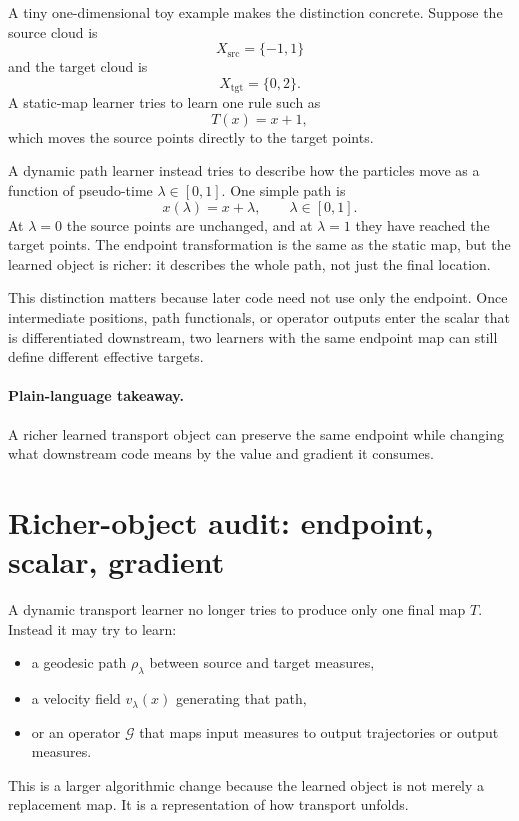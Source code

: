 A tiny one-dimensional toy example makes the distinction concrete.  Suppose the
source cloud is
\[
  X_{\mathrm{src}}=\{-1,1\}
\]
and the target cloud is
\[
  X_{\mathrm{tgt}}=\{0,2\}.
\]
A static-map learner tries to learn one rule such as
\begin{equation}
\label{eq:bf-neural-ot-dynamic-static-map}
  T(x)=x+1,
\end{equation}
which moves the source points directly to the target points.

A dynamic path learner instead tries to describe how the particles move as a
function of pseudo-time \(\lambda\in[0,1]\).  One simple path is
\begin{equation}
\label{eq:bf-neural-ot-dynamic-path-example}
  x(\lambda)=x+\lambda,
  \qquad
  \lambda\in[0,1].
\end{equation}
At \(\lambda=0\) the source points are unchanged, and at \(\lambda=1\) they
have reached the target points.  The endpoint transformation is the same as the
static map, but the learned object is richer: it describes the whole path, not
just the final location.

This distinction matters because later code need not use only the endpoint.
Once intermediate positions, path functionals, or operator outputs enter the
scalar that is differentiated downstream, two learners with the same endpoint
map can still define different effective targets.

\paragraph{Plain-language takeaway.}
A richer learned transport object can preserve the same endpoint while changing
what downstream code means by the value and gradient it consumes.

\section{Richer-object audit: endpoint, scalar, gradient}
\label{sec:bf-neural-ot-dynamic-object}
\label{sec:bf-neural-ot-dynamic-same-scalar}

A dynamic transport learner no longer tries to produce only one final map
\(T\).  Instead it may try to learn:
\begin{itemize}
  \item a geodesic path \(\rho_\lambda\) between source and target measures,
  \item a velocity field \(v_\lambda(x)\) generating that path,
  \item or an operator \(\mathcal G\) that maps input measures to output
  trajectories or output measures.
\end{itemize}
This is a larger algorithmic change because the learned object is not merely a
replacement map.  It is a representation of how transport unfolds.

